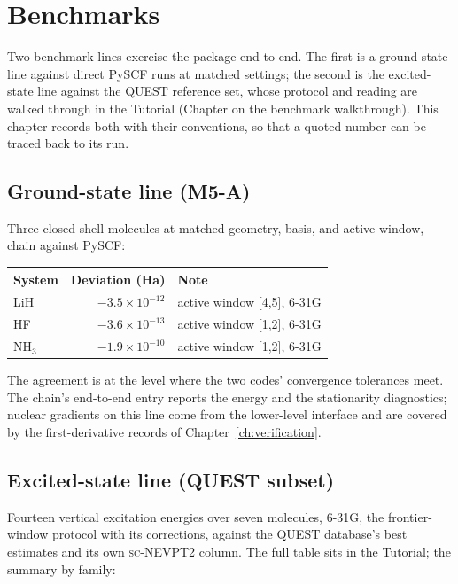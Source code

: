 \chapter{Benchmarks}
\label{ch:benchmarks}

Two benchmark lines exercise the package end to end.  The first is a
ground-state line against direct PySCF runs at matched settings; the
second is the excited-state line against the QUEST reference set,
whose protocol and reading are walked through in the Tutorial
(Chapter on the benchmark walkthrough).  This chapter records both
with their conventions, so that a quoted number can be traced back to
its run.

\section{Ground-state line (M5-A)}

Three closed-shell molecules at matched geometry, basis, and active
window, chain against PySCF:

\begin{center}
\begin{tabular}{lrl}
\toprule
System & Deviation (Ha) & Note \\
\midrule
LiH & $-3.5\times 10^{-12}$ & active window [4,5], 6-31G \\
HF & $-3.6\times 10^{-13}$ & active window [1,2], 6-31G \\
NH$_3$ & $-1.9\times 10^{-10}$ & active window [1,2], 6-31G \\
\bottomrule
\end{tabular}
\end{center}

The agreement is at the level where the two codes' convergence
tolerances meet.  The chain's end-to-end entry reports the energy and
the stationarity diagnostics; nuclear gradients on this line come
from the lower-level interface and are covered by the first-derivative
records of Chapter~\ref{ch:verification}.

\section{Excited-state line (QUEST subset)}

Fourteen vertical excitation energies over seven molecules, 6-31G,
the frontier-window protocol with its corrections, against the QUEST
database's best estimates and its own \textsc{sc}-NEVPT2 column.  The
full table sits in the Tutorial; the summary by family:

